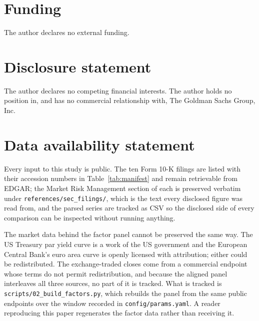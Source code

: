 %
%

\section*{Funding}
The author declares no external funding.

\section*{Disclosure statement}
The author declares no competing financial interests. The author holds no
position in, and has no commercial relationship with, The Goldman Sachs Group,
Inc.

\section*{Data availability statement}
Every input to this study is public. The ten Form 10-K filings are listed with
their accession numbers in Table~\ref{tab:manifest} and remain retrievable from
EDGAR; the Market Risk Management section of each is preserved verbatim under
\texttt{references/sec\_filings/}, which is the text every disclosed figure was
read from, and the parsed series are tracked as CSV so the disclosed side of
every comparison can be inspected without running anything.

The market data behind the factor panel cannot be preserved the same way. The
US Treasury par yield curve is a work of the US government and the European
Central Bank's euro area curve is openly licensed with attribution; either
could be redistributed. The exchange-traded closes come from a commercial
endpoint whose terms do not permit redistribution, and because the aligned
panel interleaves all three sources, no part of it is tracked. What is tracked
is \texttt{scripts/02\_build\_factors.py}, which rebuilds the panel from the
same public endpoints over the window recorded in \texttt{config/params.yaml}.
A reader reproducing this paper regenerates the factor data rather than
receiving it.

